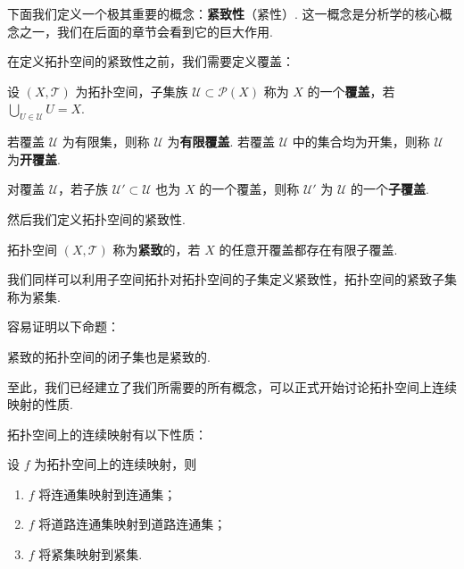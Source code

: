 \documentclass[../main.tex]{subfiles}
\begin{document}
下面我们定义一个极其重要的概念：\textbf{紧致性}（紧性）. 这一概念是分析学的核心概念之一，我们在后面的章节会看到它的巨大作用. 

在定义拓扑空间的紧致性之前，我们需要定义覆盖：

\begin{definition}[覆盖的定义]
    设 $(X, \mathcal{T})$ 为拓扑空间，子集族 $\mathcal{U} \subset \mathcal{P}(X)$ 称为 $X$ 的一个\textbf{覆盖}，若 $\bigcup\limits_{U \in \mathcal{U}} U = X$. 
    
    若覆盖 $\mathcal{U}$ 为有限集，则称 $\mathcal{U}$ 为\textbf{有限覆盖}. 若覆盖 $\mathcal{U}$ 中的集合均为开集，则称 $\mathcal{U}$ 为\textbf{开覆盖}. 
    
    对覆盖 $\mathcal{U}$，若子族 $\mathcal{U}' \subset \mathcal{U}$ 也为 $X$ 的一个覆盖，则称 $\mathcal{U}'$ 为 $\mathcal{U}$ 的一个\textbf{子覆盖}. 
\end{definition}

然后我们定义拓扑空间的紧致性. 

\begin{definition}[紧致的定义] \label{def:compact}
    拓扑空间 $(X, \mathcal{T})$ 称为\textbf{紧致}的，若 $X$ 的任意开覆盖都存在有限子覆盖. 
\end{definition}

\begin{remark}
    我们同样可以利用子空间拓扑对拓扑空间的子集定义紧致性，拓扑空间的紧致子集称为紧集. 
\end{remark}

容易证明以下命题：

\begin{proposition} \label{prop:closed-subset-compact}
    紧致的拓扑空间的闭子集也是紧致的. 
\end{proposition}

至此，我们已经建立了我们所需要的所有概念，可以正式开始讨论拓扑空间上连续映射的性质. 

拓扑空间上的连续映射有以下性质：

\begin{theorem}[拓扑空间上的连续映射的性质] \label{thm:continuous-map-topo}
    设 $f$ 为拓扑空间上的连续映射，则
    \begin{enumerate}[label = (\alph*)]
        \item $f$ 将连通集映射到连通集；
        \item $f$ 将道路连通集映射到道路连通集；
        \item $f$ 将紧集映射到紧集. 
    \end{enumerate}
\end{theorem}
\end{document}
